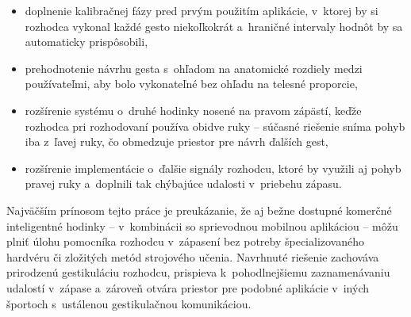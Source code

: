 \begin{itemize}
    \item doplnenie kalibračnej fázy pred prvým
        použitím aplikácie, v~ktorej by si rozhodca vykonal
        každé gesto niekoľkokrát a~hraničné intervaly hodnôt by sa
        automaticky prispôsobili,
    \item prehodnotenie návrhu gesta 
        s~ohľadom na anatomické rozdiely medzi
        používateľmi, aby bolo vykonateľné bez ohľadu na
        telesné proporcie,
    \item rozšírenie systému o~druhé hodinky nosené na
        pravom zápästí, keďže rozhodca pri rozhodovaní
        používa obidve ruky -- súčasné riešenie sníma
        pohyb iba z~ľavej ruky, čo obmedzuje priestor
        pre návrh ďalších gest,
    \item rozšírenie implementácie o~ďalšie signály
        rozhodcu, ktoré by využili aj pohyb pravej ruky
        a~doplnili tak chýbajúce udalosti v~priebehu zápasu.
\end{itemize}

Najväčším prínosom tejto práce je preukázanie, že aj bežne
dostupné komerčné inteligentné hodinky -- v~kombinácii so
sprievodnou mobilnou aplikáciou -- môžu plniť úlohu pomocníka
rozhodcu v~zápasení bez potreby špecializovaného hardvéru
či zložitých metód strojového učenia. Navrhnuté riešenie
zachováva prirodzenú gestikuláciu rozhodcu, prispieva
k~pohodlnejšiemu zaznamenávaniu udalostí v~zápase a~zároveň
otvára priestor pre podobné aplikácie v~iných športoch
s~ustálenou gestikulačnou komunikáciou.